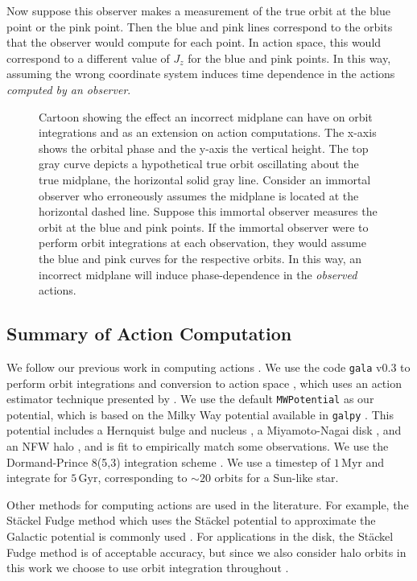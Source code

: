 \documentclass[twocolumn]{aastex62}
\newcommand{\Myr}{\text{Myr}}
\newcommand{\Gyr}{\text{Gyr}}
\begin{document}
Now suppose this observer makes a measurement of the true orbit at the blue
point or the pink point. Then the blue and pink lines correspond to the orbits
that the observer would compute for each point. In action space, this would
correspond to a different value of $J_z$ for the blue and pink points. In this
way, assuming the wrong coordinate system induces time dependence in the
actions {\em computed by an observer}.

\begin{figure*}
\caption{Cartoon showing the effect an incorrect midplane can have on orbit
integrations and as an extension on action computations. The x-axis shows the
orbital phase and the y-axis the vertical height. The top gray curve depicts a
hypothetical true orbit oscillating about the true midplane, the horizontal
solid gray line. Consider an immortal observer who erroneously assumes the
midplane is located at the horizontal dashed line. Suppose this immortal
observer measures the orbit at the blue and pink points. If the immortal
observer were to perform orbit integrations at each observation, they would
assume the blue and pink curves for the respective orbits. In this way, an
incorrect midplane will induce phase-dependence in the {\em observed}
actions.}
\label{fig:cartoon}
\end{figure*}

\subsection{Summary of Action Computation} \label{ssec:action_comp}
We follow our previous work in computing actions \citep{2018ApJ...867...31B}.
We use the code \texttt{gala} v0.3 to perform orbit integrations and
conversion to action space \citep{2017JOSS....2..388P,Price-Whelan:2018},
which uses an action estimator technique presented by
\citet{2014MNRAS.441.3284S}. We use the default \texttt{MWPotential} as our
potential, which is based on the Milky Way potential available in
\texttt{galpy} \citep{2015ApJS..216...29B}. This potential includes a
Hernquist bulge and nucleus \citep{1990ApJ...356..359H}, a Miyamoto-Nagai disk
\citep{1975PASJ...27..533M}, and an NFW halo \citep{1997ApJ...490..493N}, and
is fit to empirically match some observations. We use the Dormand-Prince
8(5,3) integration scheme \citep{Dormand80:integrator}. We use a timestep of
$1\,\Myr$ and integrate for $5\,\Gyr$, corresponding to $\sim 20$ orbits for a
Sun-like star.

Other methods for computing actions are used in the literature. For example,
the St\"ackel Fudge method \citep{2016MNRAS.457.2107S} which uses the
St\"ackel potential to approximate the Galactic potential
\citep{1985MNRAS.216..273D,2012MNRAS.426.1324B} is commonly used
\citep{2018arXiv180503653T,2018MNRAS.481.4093S,2018arXiv180803278T}. For
applications in the disk, the St\"ackel Fudge method is of acceptable
accuracy, but since we also consider halo orbits in this work we choose to use
orbit integration throughout \citep{2016MNRAS.457.2107S}.
\end{document}
